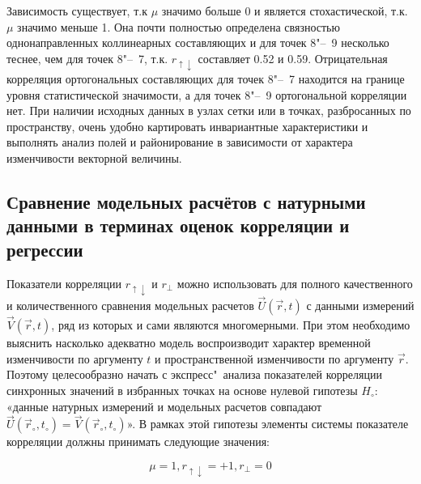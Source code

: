 {{{{{%

Зависимость существует, т.к $\mu$ значимо больше 0 и является стохастической, т.к. $\mu$ значимо меньше 1. Она почти полностью определена связностью однонаправленных коллинеарных составляющих и для точек 8"--~9 несколько теснее, чем для точек 8"--~7, т.к. $r_{\uparrow\downarrow}$ составляет 0.52 и 0.59. Отрицательная корреляция ортогональных составляющих для точек 8"--~7 находится на границе уровня статистической значимости, а для точек 8"--~9 ортогональной корреляции нет.
При наличии исходных данных в узлах сетки или в точках, разбросанных по пространству, очень удобно картировать инвариантные характеристики и выполнять анализ полей и районирование в зависимости от характера изменчивости векторной величины.

\subsection{Сравнение модельных расчётов с натурными данными в терминах оценок корреляции и регрессии}
Показатели корреляции $r_{\uparrow\downarrow}$ и $r_{\perp}$ можно использовать для полного качественного и количественного сравнения модельных расчетов $\vec{U}(\vec{r},t)$ с данными измерений $\vec{V}(\vec{r},t)$, ряд из которых и сами являются многомерными. При этом необходимо выяснить насколько адекватно модель воспроизводит характер временной изменчивости по аргументу $t$ и пространственной изменчивости по аргументу $\vec{r}$. Поэтому целесообразно начать с экспресс"~анализа показателей корреляции синхронных значений в избранных точках на основе нулевой гипотезы $H_{\circ}$: «данные натурных измерений и модельных расчетов совпадают $\vec{U}(\vec{r}_{\circ},t_{\circ})=\vec{V}(\vec{r}_{\circ},t_{\circ})$». В рамках этой гипотезы элементы системы показателе корреляции   должны принимать следующие значения:

\begin{equation}
\label{eq:equation3_26}
{\mu=1, r_{\uparrow\downarrow}=+1, r_{\perp}=0}
\end{equation}  

}}}}}
